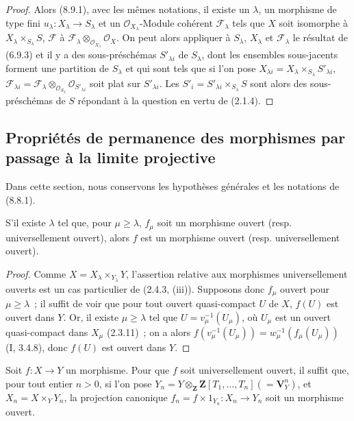\begin{proof}
Alors (8.9.1), avec les mêmes notations, il existe un $\lambda$, un morphisme
de type fini $u_\lambda:X_\lambda\to S_\lambda$ et un
$\mathcal O_{X_\lambda}$-Module cohérent $\mathcal F_\lambda$ tels que $X$
soit isomorphe à $X_\lambda\times_{S_\lambda}S$, $\mathcal F$ à
$\mathcal F_\lambda\otimes_{\mathcal O_{X_\lambda}}\mathcal O_X$. On peut
alors appliquer à $S_\lambda$, $X_\lambda$ et $\mathcal F_\lambda$ le
résultat de (6.9.3) et il y a des sous-préschémas $S'_{\lambda i}$ de
$S_\lambda$, dont les ensembles sous-jacents forment une partition de
$S_\lambda$ et qui sont tels que si l'on pose
$X_{\lambda i}=X_\lambda\times_{S_\lambda}S'_{\lambda i}$,
$\mathcal F_{\lambda i}=\mathcal F_\lambda\otimes_{\mathcal O_{S_\lambda}}
\mathcal O_{S'_{\lambda i}}$ soit plat sur $S'_{\lambda i}$. Les
$S'_i=S'_{\lambda i}\times_{S_\lambda}S$ sont alors des sous-préschémas de
$S$ répondant à la question en vertu de (2.1.4).
\end{proof}

\subsection{Propriétés de permanence des morphismes par passage à la limite projective}
\label{subsection:IV.8.10-fr}

Dans cette section, nous conservons les hypothèses générales et les notations
de (8.8.1).

\begin{proposition}[8.10.1]
S'il existe $\lambda$ tel que, pour $\mu\geq\lambda$, $f_\mu$ soit un morphisme
ouvert (resp. universellement ouvert), alors $f$ est un morphisme ouvert
(resp. universellement ouvert).
\end{proposition}

\begin{proof}
Comme $X=X_\lambda\times_{Y_\lambda}Y$, l'assertion relative aux morphismes
universellement ouverts est un cas particulier de (2.4.3, (iii)). Supposons
donc $f_\mu$ ouvert pour $\mu\geq\lambda$~; il suffit de voir que pour tout
ouvert quasi-compact $U$ de $X$, $f(U)$ est ouvert dans $Y$. Or, il existe
$\mu\geq\lambda$ tel que $U=v_\mu^{-1}(U_\mu)$, où $U_\mu$ est un ouvert
quasi-compact dans $X_\mu$ (2.3.11)~; on a alors
$f(v_\mu^{-1}(U_\mu))=w_\mu^{-1}(f_\mu(U_\mu))$ (I, 3.4.8), donc $f(U)$ est
ouvert dans $Y$.
\end{proof}

\begin{corollary}[8.10.2]
\label{IV.8.10.2-fr}
Soit $f:X\to Y$ un morphisme. Pour que $f$ soit universellement ouvert, il
suffit que, pour tout entier $n>0$, si l'on pose
$Y_n=Y\otimes_{\mathbf Z}\mathbf Z[T_1,\ldots,T_n](=\mathbf V_Y^n)$, et
$X_n=X\times_YY_n$, la projection canonique
$f_n=f\times1_{Y_n}:X_n\to Y_n$ soit un morphisme ouvert.
\end{corollary}

